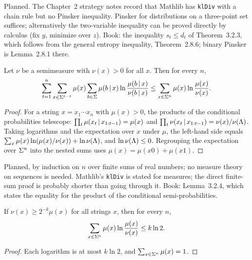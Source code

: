 \begin{formalization}
Planned. The Chapter~2 strategy notes record that Mathlib has \texttt{klDiv} with a
chain rule but no Pinsker inequality. Pinsker for distributions on a three-point set
suffices; alternatively the two-variable inequality can be proved directly by calculus
(fix \( y \), minimize over \( z \)). Book: the inequality \( s_{t} \le d_{t} \) of
Theorem~3.2.3, which follows from the general entropy inequality, Theorem~2.8.6; binary
Pinsker is Lemma~2.8.1 there.
\end{formalization}

\begin{lemma}[Telescoping]\label{lem:sol-telescope}
Let \( \nu \) be a semimeasure with \( \nu(x) > 0 \) for all \( x \). Then for every
\( n \),
 \[
   \sum_{t=1}^{n} \sum_{x \in \Sigma^{t-1}} \mu(x) \sum_{b \in \Sigma}
     \mu(b \,\vert\, x) \ln\frac{\mu(b \,\vert\, x)}{\nu(b \,\vert\, x)}
   \le \sum_{x \in \Sigma^{n}} \mu(x) \ln\frac{\mu(x)}{\nu(x)}.
 \]
\end{lemma}
\begin{proof}
For a string \( x = x_{1}\dotsm x_{n} \) with \( \mu(x) > 0 \), the products of the
conditional probabilities telescope:
\( \prod_{t} \mu(x_{t} \,\vert\, x_{1:t-1}) = \mu(x) \) and
\( \prod_{t} \nu(x_{t} \,\vert\, x_{1:t-1}) = \nu(x)/\nu(\Lambda) \). Taking logarithms and the
expectation over \( x \) under \( \mu \), the left-hand side equals
\( \sum_{x} \mu(x) \ln(\mu(x)/\nu(x)) + \ln\nu(\Lambda) \), and \( \ln\nu(\Lambda) \le 0 \).
Regrouping the expectation over \( \Sigma^{n} \) into the nested sums uses
\( \mu(x) = \mu(x0) + \mu(x1) \).
\end{proof}

\begin{formalization}
Planned, by induction on \( n \) over finite sums of real numbers; no measure theory on
sequences is needed. Mathlib's \texttt{klDiv} is stated for measures; the direct
finite-sum proof is probably shorter than going through it. Book: Lemma~3.2.4, which
states the equality for the product of the conditional semi-probabilities.
\end{formalization}

\begin{lemma}\label{lem:sol-dominance-kl}
If \( \nu(x) \ge 2^{-k}\mu(x) \) for all strings \( x \), then for every \( n \),
 \[
   \sum_{x \in \Sigma^{n}} \mu(x) \ln\frac{\mu(x)}{\nu(x)} \le k \ln 2.
 \]
\end{lemma}
\begin{proof}
Each logarithm is at most \( k \ln 2 \), and \( \sum_{x \in \Sigma^{n}} \mu(x) = 1 \).
\end{proof}

